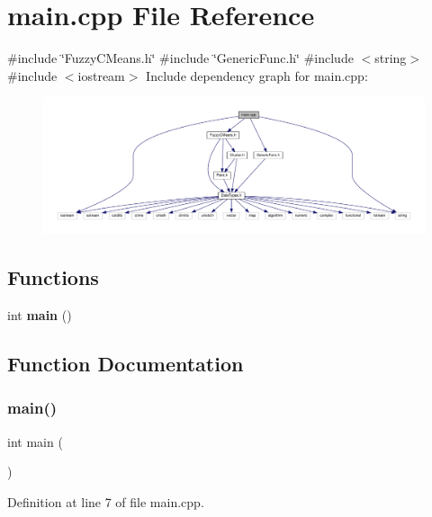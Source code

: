 \section{main.\+cpp File Reference}
\label{main_8cpp}
{\ttfamily \#include \char`\"{}Fuzzy\+C\+Means.\+h\char`\"{}}\newline
{\ttfamily \#include \char`\"{}Generic\+Func.\+h\char`\"{}}\newline
{\ttfamily \#include $<$string$>$}\newline
{\ttfamily \#include $<$iostream$>$}\newline
Include dependency graph for main.\+cpp\+:
\nopagebreak
\begin{figure}[H]
\begin{center}
\leavevmode
\includegraphics[width=350pt]{main_8cpp__incl}
\end{center}
\end{figure}
\subsection*{Functions}
\begin{DoxyCompactItemize}
\item 
int \textbf{ main} ()
\end{DoxyCompactItemize}


\subsection{Function Documentation}
\mbox{\label{main_8cpp_ae66f6b31b5ad750f1fe042a706a4e3d4}} 
\subsubsection{main()}
{\footnotesize\ttfamily int main (\begin{DoxyParamCaption}{ }\end{DoxyParamCaption})}



Definition at line 7 of file main.\+cpp.

